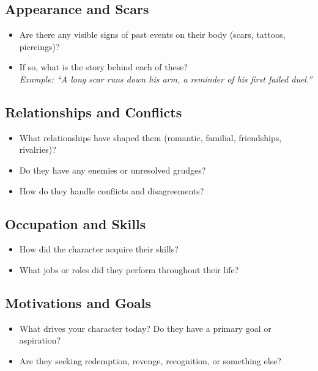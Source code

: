 \documentclass[12pt]{book}
\begin{document}
\subsection*{Appearance and Scars}

\begin{itemize}
    \item Are there any visible signs of past events on their body (scars, tattoos, piercings)?
    \item If so, what is the story behind each of these? \\
    \textit{Example: ``A long scar runs down his arm, a reminder of his first failed duel.''}
\end{itemize}

\subsection*{Relationships and Conflicts}

\begin{itemize}
    \item What relationships have shaped them (romantic, familial, friendships, rivalries)?
    \item Do they have any enemies or unresolved grudges?
    \item How do they handle conflicts and disagreements?
\end{itemize}

\subsection*{Occupation and Skills}

\begin{itemize}
    \item How did the character acquire their skills?
    \item What jobs or roles did they perform throughout their life?
\end{itemize}

\subsection*{Motivations and Goals}

\begin{itemize}
    \item What drives your character today? Do they have a primary goal or aspiration?
    \item Are they seeking redemption, revenge, recognition, or something else?
\end{itemize}
\end{document}
